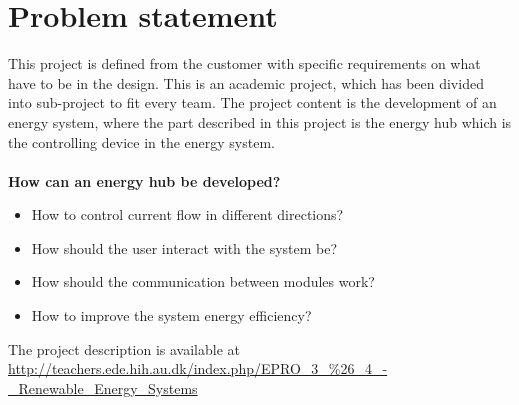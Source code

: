 \chapter{Problem statement}
This project is defined from the customer with specific requirements on what have to be in the design. This is an academic project, which has been divided into sub-project to fit every team. The project content is the development of an energy system, where the part described in this project is the energy hub which is the controlling device in the energy system.\\
\\
\textbf{How can an energy hub be developed?}
\begin{itemize}
\item How to control current flow in different directions?\\
\item How should the user interact with the system be?\\
\item How should the communication between modules work?\\
\item How to improve the system energy efficiency?\\
\end{itemize}
The project description is available at \url{http://teachers.ede.hih.au.dk/index.php/EPRO_3_%26_4_-_Renewable_Energy_Systems}
